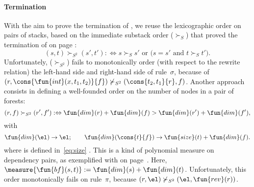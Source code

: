 \paragraph{Termination}
  With the aim to prove the termination of
, we reuse the lexicographic order on
pairs of stacks, based on the immediate substack order
(\(\succ_{S}\)) that proved
the termination of  on page
\pageref{merging_termination}:
\begin{equation*}
(s,t) \succ_{S^2} (s',t') :\Leftrightarrow \text{\(s \succ_{S} s'\) or
    (\(s = s'\) and \(t \succ_{S} t'\))}.
\end{equation*}
Unfortunately, (\(\succ_{S^2}\)) fails to monotonically order (with
respect to the rewrite relation) the left\hyp{}hand side and
right\hyp{}hand side of rule~\(\sigma\), because of
\((r,\cons{\fun{int}(x,t_1,t_2)}{f}) \nsucc_{S^2}
(\cons{t_2,t_1}{r},f)\). Another approach consists in defining a
well\hyp{}founded order on the number of nodes in a pair of forests:
\begin{equation*}
(r,f) \succ_{S^2} (r',f') :\Leftrightarrow \fun{dim}(r) +
  \fun{dim}(f) > \fun{dim}(r') + \fun{dim}(f'),
\end{equation*}
with
\begin{equation*}
\fun{dim}(\el) \rightarrow \el;\qquad
\fun{dim}(\cons{t}{f}) \rightarrow \fun{size}(t) + \fun{dim}(f).
\end{equation*}
where  is
defined in~\eqref{eq:size} . This is a kind of
polynomial measure on dependency
pairs, as exemplified with
 on
page~\pageref{flattening:termination}. Here, \(\measure{\fun{bf}(s,t)}
:= \fun{dim}(s) + \fun{dim}(t)\). Unfortunately, this order
monotonically fails on rule~\(\pi\), because \((r,\el) \nsucc_{S^2}
(\el,\fun{rev}(r))\).

